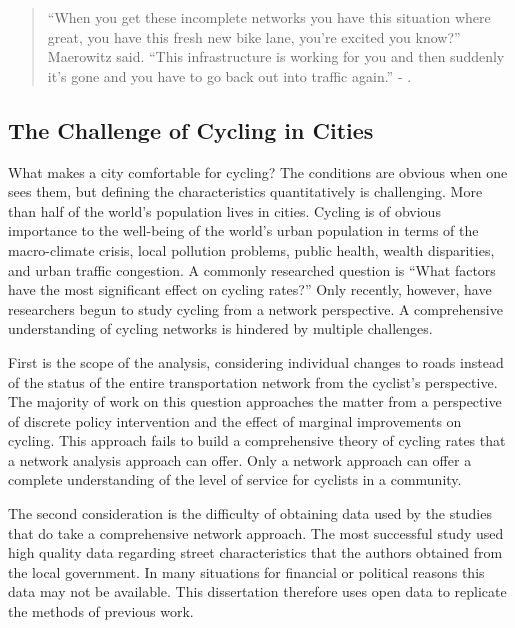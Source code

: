 

\begin{quote}
``When you get these incomplete networks you have this situation where great, you have this fresh new bike lane, you're excited you know?'' Maerowitz said. ``This infrastructure is working for you and then suddenly it's gone and you have to go back out into traffic again.'' - \cite{juhasz2019}.
\end{quote}
 
\subsection{The Challenge of Cycling in Cities}

What makes a city comfortable for cycling? The conditions are obvious when one sees them, but defining the characteristics quantitatively is challenging. More than half of the world's population lives in cities\parencite{half}. Cycling is of obvious importance to the well-being of the world's  urban population in terms of the macro-climate crisis, local pollution problems,  public health, wealth disparities, and urban traffic congestion. A commonly researched question is ``What factors have the most significant effect on cycling rates?'' Only recently, however, have researchers begun to study cycling from a network perspective. A comprehensive understanding of cycling networks is hindered by multiple challenges. 


First is the scope of the analysis, considering individual changes to roads instead of the status of the entire transportation network from the cyclist's perspective.  The majority of work on this question approaches the matter from a perspective of discrete policy intervention and the effect of marginal improvements on cycling. This approach fails to build a comprehensive theory of cycling rates that a network analysis approach can offer. Only a network approach can offer a complete understanding of the level of service for cyclists in a community. 

The second consideration is the difficulty of obtaining data used by the studies that do take a comprehensive network approach. The most successful study used high quality data regarding street characteristics that the authors obtained from the local government. In many situations for financial or political reasons this data may not be available. This dissertation therefore uses open data to replicate the methods of previous work. 

